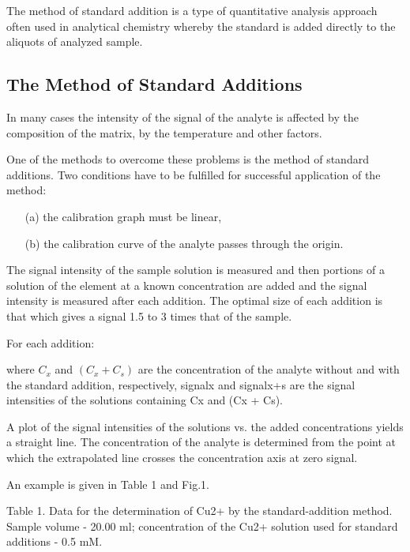 The method of standard addition is a type of quantitative analysis approach often used in analytical chemistry whereby the standard is added directly to the aliquots of analyzed sample.




\subsection{The Method of Standard Additions}
In many cases the intensity of the signal of the analyte is affected by the composition of the matrix, by the temperature and other factors.
 
One of the methods to overcome these problems is the method of standard additions. Two conditions have to be fulfilled for successful application of the method:

\begin{itemize}
\item[(a)]    the calibration graph must be linear,
\item[(b)]   the calibration curve of the analyte passes through the origin.
\end{itemize}

The signal intensity of the sample solution is measured and then portions of a solution of the element at a known concentration are added and the signal intensity is measured after each addition. The optimal size of each addition is that which gives a signal 1.5 to 3 times that of the sample.
 
For each addition:

 
where $C_x$ and $(C_x + C_s)$ are the concentration of the analyte without and with the standard addition, respectively,
signalx and signalx+s are the signal intensities of  the solutions containing Cx and (Cx + Cs).
 
A plot of the signal intensities of the solutions vs. the added concentrations yields a straight line. The concentration of the analyte is determined from the point at which the extrapolated line crosses the concentration axis at zero signal.
 
An example is given in Table 1 and Fig.1.
 
Table 1. Data for the determination of Cu2+ by the standard-addition method.
Sample volume - 20.00 ml; concentration of the Cu2+ solution used for standard additions - 0.5 mM.



